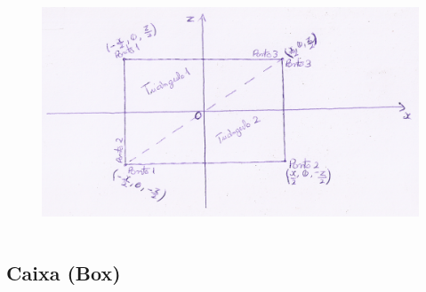 \documentclass{article}
\begin{document}
\begin{figure}[ht!]
\centering
\includegraphics[height=7cm]{planeMath.png}
\end{figure}

\subsection{Caixa (Box)}
\end{document}
